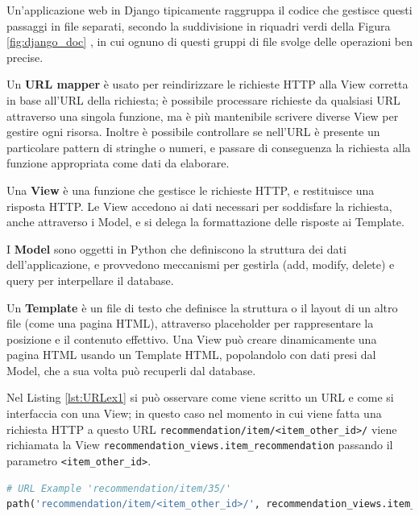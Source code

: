 \hfill\break
Un'applicazione web in Django tipicamente raggruppa il codice che gestisce questi passaggi in file separati, secondo la 
suddivisione in riquadri verdi della Figura \ref{fig:django_doc} \cite{mdn-django-documentation}, in cui ognuno di questi
gruppi di file svolge delle operazioni ben precise.
\begin{description}
    \item Un \textbf{URL mapper} è usato per reindirizzare le richieste HTTP alla View corretta in base all'URL della richiesta; è possibile processare 
    richieste da qualsiasi URL attraverso una singola funzione, ma è più mantenibile scrivere diverse View per gestire ogni risorsa. 
    Inoltre è possibile controllare se nell'URL è presente un particolare pattern di stringhe o numeri, e passare di conseguenza la richiesta alla 
    funzione appropriata come dati da elaborare.
    \item Una \textbf{View} è una funzione che gestisce le richieste HTTP, e restituisce una risposta HTTP. Le View accedono ai dati necessari per soddisfare la 
    richiesta, anche attraverso i Model, e si delega la formattazione delle risposte ai Template.
    \item I \textbf{Model} sono oggetti in Python che definiscono la struttura dei dati dell'applicazione, e provvedono meccanismi per gestirla (add, modify, 
    delete) e query per interpellare il database.
    \item Un \textbf{Template} è un file di testo che definisce la struttura o il layout di un altro file (come una pagina HTML), attraverso placeholder per
    rappresentare la posizione e il contenuto effettivo. Una View può creare dinamicamente una pagina HTML usando un Template HTML, popolandolo con dati presi dal Model, 
    che a sua volta può recuperli dal database.
\end{description}
Nel Listing \ref{lst:URLex1} si può osservare come viene scritto un URL e come si interfaccia con una View; in questo caso nel 
momento in cui viene fatta una richiesta HTTP a questo URL \texttt{recommendation/item/<item\_other\_id>/} viene richiamata la 
View \texttt{recommendation\_views.item\_recommendation} passando il parametro \texttt{<item\_other\_id>}.
\lstset{style=python_code_style}
\begin{lstlisting}[language=Python, label=lst:URLex1]
# URL Example 'recommendation/item/35/'
path('recommendation/item/<item_other_id>/', recommendation_views.item_recommendation, name='item_recommendation')
\end{lstlisting}
